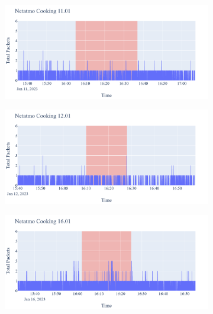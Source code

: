 \begin{figure}[H]
    \begin{subfigure}[b]{0.5\textwidth}
        \centering
        \includegraphics[width=1.2\hsize]{figures/Netatmo_Cooking_Packets_11.01.png}
    \end{subfigure}
    \begin{subfigure}[b]{0.5\textwidth}
        \centering
        \includegraphics[width=1.2\hsize]{figures/Netatmo_Cooking_Packets_12.01.png}
    \end{subfigure}
    \begin{subfigure}[b]{0.5\textwidth}
        \centering
        \includegraphics[width=1.2\hsize]{figures/Netatmo_Cooking_Packets_16.01.png}
    \end{subfigure}
    \begin{subfigure}[b]{0.5\textwidth}

\end{subfigure}
\end{figure}
